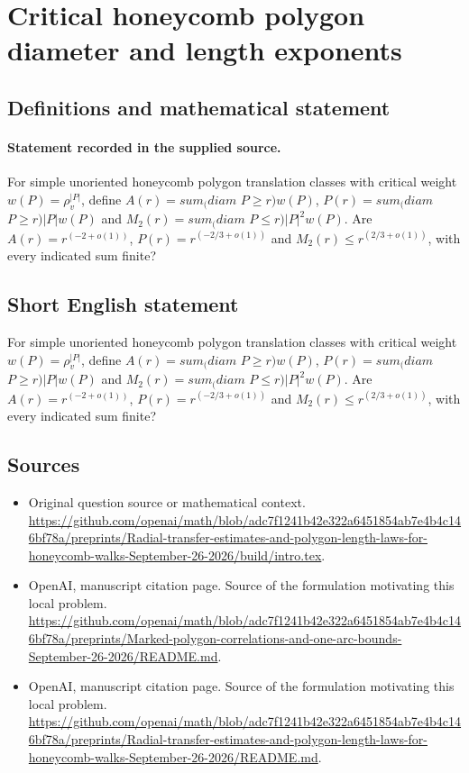 \documentclass[11pt]{article}
\begin{document}
\section*{Critical honeycomb polygon diameter and length exponents}\label{statement}
\subsection{Definitions and mathematical statement}
\paragraph{Statement recorded in the supplied source.}
For simple unoriented honeycomb polygon translation classes with critical weight $w(P)=\rho _v^{|P|}$, define $A(r)=sum_(diam$ $P\geq r)w(P)$, $P(r)=sum_(diam$ $P\geq r)|P|w(P)$ and $M_2(r)=sum_(diam$ $P\leq r)|P|^2w(P)$. Are $A(r)=r^(-2+o(1))$, $P(r)=r^(-2/3+o(1))$ and $M_2(r)\leq r^(2/3+o(1))$, with every indicated sum finite?
\subsection{Short English statement}
For simple unoriented honeycomb polygon translation classes with critical weight $w(P)=\rho _v^{|P|}$, define $A(r)=sum_(diam$ $P\geq r)w(P)$, $P(r)=sum_(diam$ $P\geq r)|P|w(P)$ and $M_2(r)=sum_(diam$ $P\leq r)|P|^2w(P)$. Are $A(r)=r^(-2+o(1))$, $P(r)=r^(-2/3+o(1))$ and $M_2(r)\leq r^(2/3+o(1))$, with every indicated sum finite?
\subsection{Sources}
\begin{itemize}
\item[S1] Original question source or mathematical context.
\url{https://github.com/openai/math/blob/adc7f1241b42e322a6451854ab7e4b4c146bf78a/preprints/Radial-transfer-estimates-and-polygon-length-laws-for-honeycomb-walks-September-26-2026/build/intro.tex}.
\item[S2] OpenAI, manuscript citation page. Source of the formulation motivating this local problem.
\url{https://github.com/openai/math/blob/adc7f1241b42e322a6451854ab7e4b4c146bf78a/preprints/Marked-polygon-correlations-and-one-arc-bounds-September-26-2026/README.md}.
\item[S3] OpenAI, manuscript citation page. Source of the formulation motivating this local problem.
\url{https://github.com/openai/math/blob/adc7f1241b42e322a6451854ab7e4b4c146bf78a/preprints/Radial-transfer-estimates-and-polygon-length-laws-for-honeycomb-walks-September-26-2026/README.md}.
\end{itemize}
\end{document}
